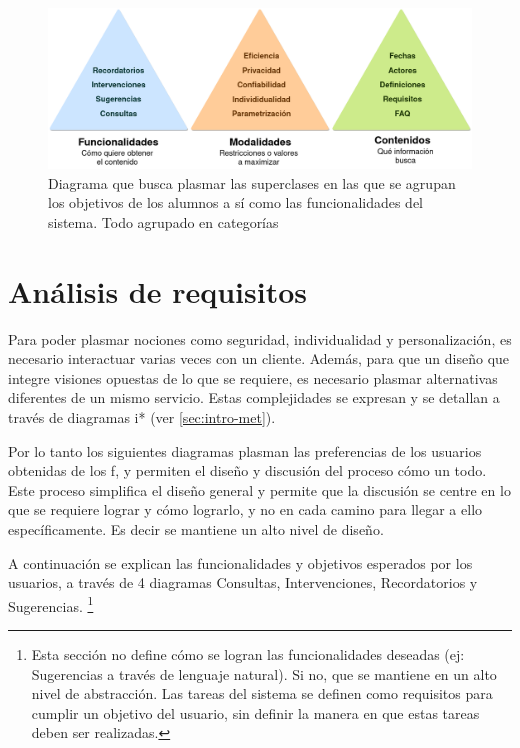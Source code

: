         \begin{figure}[h!]
            \centering
            \includegraphics[width=\textwidth]{media/imagenes/focus_groups/objetivos_y_cualidades.png}
            \caption[Diagrama Tipos de Interacción]{Diagrama que busca plasmar las superclases en las que se agrupan los objetivos de los alumnos a sí como las funcionalidades del sistema. Todo agrupado en categorías}
            \label{fig:objetivos_cualidades}
        \end{figure}

\section{Análisis de requisitos}
        \par Para poder plasmar nociones como seguridad, individualidad y personalización, es necesario interactuar varias veces con un cliente. Además, para que un diseño que integre visiones opuestas de lo que se requiere, es necesario plasmar alternativas diferentes de un mismo servicio. Estas complejidades se expresan y se detallan a través de diagramas i* (ver \ref{sec:intro-met}).
        \par Por lo tanto los siguientes diagramas plasman las preferencias de los usuarios obtenidas de los \acrlong{f}, y permiten el diseño y discusión del proceso cómo un todo. Este proceso simplifica el diseño general y permite que la discusión se centre en lo que se requiere lograr y cómo lograrlo, y no en cada camino para llegar a ello específicamente. Es decir se mantiene un alto nivel de diseño.
        \par A continuación se explican las funcionalidades y objetivos esperados por los usuarios, a través de 4 diagramas Consultas, Intervenciones, Recordatorios y Sugerencias. \footnote{Esta sección no define cómo se logran las funcionalidades deseadas (ej: Sugerencias a través de lenguaje natural). Si no, que se mantiene en un alto nivel de abstracción. Las tareas del sistema se definen como requisitos para cumplir un objetivo del usuario, sin definir la manera en que estas tareas deben ser realizadas.}
    
